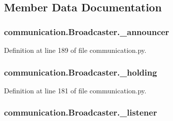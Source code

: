 \subsection{Member Data Documentation}
\hypertarget{classcommunication_1_1Broadcaster_aa3825b554be4b8267edeec81a236002c}{}
\subsubsection[{\+\_\+announcer}]{\setlength{\rightskip}{0pt plus 5cm}communication.\+Broadcaster.\+\_\+announcer\hspace{0.3cm}{\ttfamily [private]}}\label{classcommunication_1_1Broadcaster_aa3825b554be4b8267edeec81a236002c}


Definition at line 189 of file communication.\+py.

\hypertarget{classcommunication_1_1Broadcaster_af6fa35f5500f9792e9d58ac6b7a0d280}{}
\subsubsection[{\+\_\+holding}]{\setlength{\rightskip}{0pt plus 5cm}communication.\+Broadcaster.\+\_\+holding\hspace{0.3cm}{\ttfamily [private]}}\label{classcommunication_1_1Broadcaster_af6fa35f5500f9792e9d58ac6b7a0d280}


Definition at line 181 of file communication.\+py.

\hypertarget{classcommunication_1_1Broadcaster_a38eb3550100c44a3fcaa9a416e2c0066}{}
\subsubsection[{\+\_\+listener}]{\setlength{\rightskip}{0pt plus 5cm}communication.\+Broadcaster.\+\_\+listener\hspace{0.3cm}{\ttfamily [private]}}\label{classcommunication_1_1Broadcaster_a38eb3550100c44a3fcaa9a416e2c0066}


